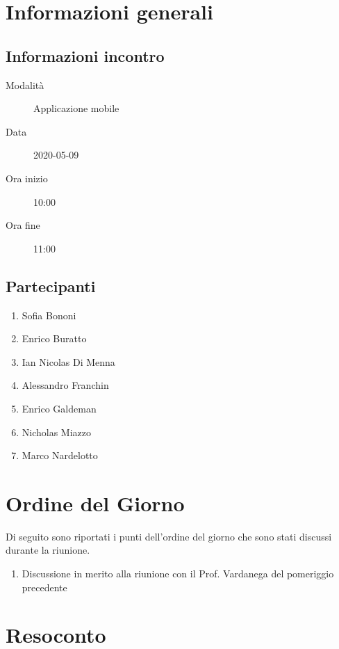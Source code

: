 \documentclass{article}
\begin{document}


\section{Informazioni generali}%
\label{sec:informazioni_generali}

\subsection{Informazioni incontro}%
\label{sub:informazioni_incontro}

\begin{description}
  \item[Modalità] Applicazione mobile 
  \item[Data] 2020-05-09
  \item[Ora inizio] 10:00
  \item[Ora fine] 11:00
\end{description}

\subsection{Partecipanti}%
\label{sub:partecipanti}

\begin{enumerate}
  \item Sofia Bononi
  \item Enrico Buratto
  \item Ian Nicolas Di Menna
  \item Alessandro Franchin
  \item Enrico Galdeman
  \item Nicholas Miazzo
  \item Marco Nardelotto
\end{enumerate}

\section{Ordine del Giorno}%
\label{ordine_del_giorno}
Di seguito sono riportati i punti dell'ordine del giorno che sono stati discussi durante la riunione.
\begin{enumerate}
  \item Discussione in merito alla riunione con il Prof. Vardanega del pomeriggio precedente
\end{enumerate}

\section{Resoconto}%
\label{resoconto}
\end{document}
